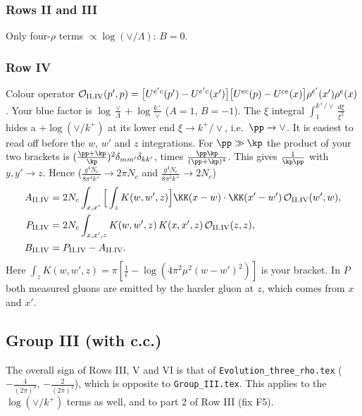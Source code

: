 \subsubsection{Rows II and III}
Only four-$\rho$ terms $\propto\log(\vee/\Lambda)$: \textbf{$B=0$}.

\subsubsection{Row IV}\label{sec:II.IV}
Colour operator $\mathcal O_{\rm II.IV}(p',p)=\big[U^{e'c}(p')-U^{e'c}(x')\big]\big[U^{ec}(p)-U^{ce}(x)\big]\rho^{e'}(x')\rho^e(x)$. Your blue factor is $\log\frac{\vee}{\Lambda}+\log\frac{k^+}{\vee}$ ($A=1$, $B=-1$). The $\xi$ integral $\int_1^{k^+/\vee}\frac{d\xi}{\xi^2}$ hides a $+\log(\vee/k^+)$ at its lower end $\xi\to k^+/\vee$, i.e.\ $\pp\to\vee$. It is easiest to read off before the $w$, $w'$ and $z$ integrations. For $\pp\gg\kp$ the product of your two brackets is $(\frac{\pp+\kp}{\kp})^2\delta_{mm'}\delta_{kk'}$, times $\frac{\pp\kp}{(\pp+\kp)^4}$. This gives $\frac{1}{\kp\pp}$ with $y,y'\to z$. Hence ($\frac{g^4N_c}{8\pi^4k^+}\to2\pi N_c$ and $\frac{g^4N_c}{8\pi^5k^+}\to2N_c$)
\begin{align}
A_{\rm II.IV}&=2N_c\int_{x,x'}\Big[\int_zK(w,w',z)\Big]\KK(x-w)\cdot\KK(x'-w')\,\mathcal O_{\rm II.IV}(w',w),\notag\\
P_{\rm II.IV}&=2N_c\int_{x,x',z}K(w,w',z)\,K(x,x',z)\,\mathcal O_{\rm II.IV}(z,z),\notag\\
B_{\rm II.IV}&=P_{\rm II.IV}-A_{\rm II.IV}.
\end{align}
Here $\int_zK(w,w',z)=\pi[\frac1{\bar\epsilon}-\log(4\pi^2\mu^2(w-w')^2)]$ is your bracket. In $P$ both measured gluons are emitted by the harder gluon at $z$, which comes from $x$ and $x'$.

\subsection{Group III (with c.c.)}
The overall sign of Rows III, V and VI is that of \texttt{Evolution\_three\_rho.tex} ($-\frac{4}{(2\pi)^3}$, $-\frac{2}{(2\pi)^3}$), which is opposite to \texttt{Group\_III.tex}. This applies to the $\log(\vee/k^+)$ terms as well, and to part 2 of Row III (fix F5).

